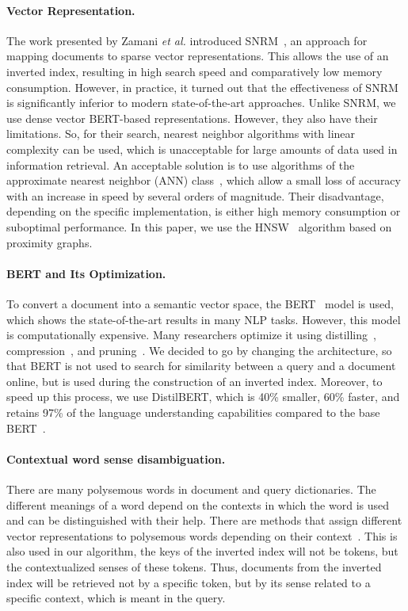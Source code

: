 \documentclass[
    twocolumn,
]{template/ceurart}
\begin{document}
    \paragraph{Vector Representation.}
    The work presented by Zamani \textit{et al.} introduced SNRM~\cite{snrm},
    an approach for mapping documents to sparse vector representations.
    This allows the use of an inverted index, resulting in high search speed and comparatively low memory consumption.
    However, in practice, it turned out that the effectiveness of SNRM is significantly
    inferior to modern state-of-the-art approaches.
    Unlike SNRM, we use dense vector BERT-based representations.
    However, they also have their limitations.
    So, for their search, nearest neighbor algorithms with linear complexity can be used,
    which is unacceptable for large amounts of data used in information retrieval.
    An acceptable solution is to use algorithms of the approximate nearest neighbor (ANN) class~\cite{ann},
    which allow a small loss of accuracy with an increase in speed by several orders of magnitude.
    Their disadvantage, depending on the specific implementation,
    is either high memory consumption or suboptimal performance.
    In this paper, we use the HNSW~\cite{hnsw} algorithm based on proximity graphs.

    \paragraph{BERT and Its Optimization.}
    To convert a document into a semantic vector space, the BERT~\cite{devlin2018bert} model is used,
    which shows the state-of-the-art results in many NLP tasks.
    However, this model is computationally expensive.
    Many researchers optimize it using distilling~\cite{bertDistilling},
    compression~\cite{bertCompression}, and pruning~\cite{bertPruning}.
    We decided to go by changing the architecture, so that BERT is not used to search for
    similarity between a query and a document online, but is used during the construction of an inverted index.
    Moreover, to speed up this process, we use DistilBERT, which is 40\% smaller, 60\% faster,
    and retains 97\% of the language understanding capabilities compared to the base BERT~\cite{bertDistilling}.

    \paragraph{Contextual word sense disambiguation.}
    There are many polysemous words in document and query dictionaries.
    The different meanings of a word depend on the contexts in which the word is used and
    can be distinguished with their help.
    There are methods that assign different vector representations
    to polysemous words depending on their context~\cite{athiwaratkun2018probabilistic}.
    This is also used in our algorithm, the keys of the inverted index will not be tokens,
    but the contextualized senses of these tokens.
    Thus, documents from the inverted index will be retrieved not by a specific token,
    but by its sense related to a specific context, which is meant in the query.
\end{document}
